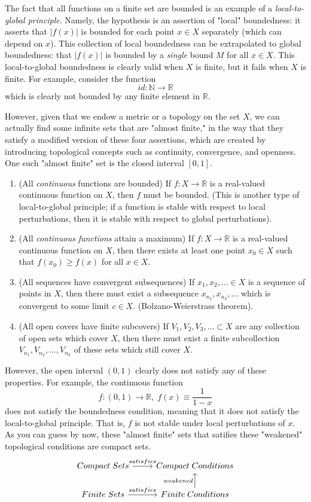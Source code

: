 \documentclass{article}
\theoremstyle{remark}
\theoremstyle{definition}
\begin{document}
The fact that all functions on a finite set are bounded is an example of a \textit{local-to-global principle}. Namely, the hypothesis is an assertion of "local" boundedness: it asserts that $|f(x)|$ is bounded for each point $x \in X$ separately (which can depend on $x$). This collection of local boundedness can be extrapolated to global boundedness: that $|f(x)|$ is bounded by a \textit{single} bound $M$ for all $x \in X$. This local-to-global boundedness is clearly valid when $X$ is finite, but it fails when $X$ is finite. For example, consider the function
\[id: \mathbb{N} \longrightarrow \mathbb{R}\]
which is clearly not bounded by any finite element in $\mathbb{R}$. 

However, given that we endow a metric or a topology on the set $X$, we can actually find some infinite sets that are "almost finite," in the way that they satisfy a modified version of these four assertions, which are created by introducing topological concepts such as continuity, convergence, and openness. One such "almost finite" set is the closed interval $[0,1]$. 
\begin{enumerate}
    \item (All \textit{continuous} functions are bounded) If $f: X \longrightarrow \mathbb{R}$ is a real-valued continuous function on $X$, then $f$ must be bounded. (This is another type of local-to-global principle; if a function is stable with respect to local perturbations, then it is stable with respect to global perturbations).
    \item (All \textit{continuous functions} attain a maximum) If $f: X \longrightarrow \mathbb{R}$ is a real-valued continuous function on $X$, then there exists at least one point $x_0 \in X$ such that $f(x_0) \geq f(x)$ for all $x \in X$. 
    \item (All sequences have convergent subsequences) If $x_1, x_2, ... \in X$ is a sequence of points in $X$, then there must exist a subsequence $x_{n_1}, x_{n_2}, ...$ which is convergent to some limit $c \in X$. (Bolzano-Weierstrass theorem).
    \item (All open covers have finite subcovers) If $V_1, V_2, V_3, ... \subset X$ are any collection of open sets which cover $X$, then there must exist a finite subcollection $V_{n_1}, V_{n_2}, ..., V_{n_k}$ of these sets which still cover $X$. 
\end{enumerate}

However, the open interval $(0,1)$ clearly does not satisfy any of these properties. For example, the continuous function 
\[f: (0,1) \longrightarrow \mathbb{R}, \; f(x) \equiv \frac{1}{1-x}\]
does not satisfy the boundedness condition, meaning that it does not satisfy the local-to-global principle. That is, $f$ is not stable under local perturbations of $x$. As you can guess by now, these "almost finite" sets that satifies these "weakened" topological conditions are compact sets. 
\[\begin{tikzcd}
Compact \;Sets \arrow{r}{satisfies} & Compact \;Conditions \\
Finite \;Sets \arrow{r}{satisfies} & Finite \;Conditions \arrow{u}{weakened}
\end{tikzcd}\]
\end{document}
